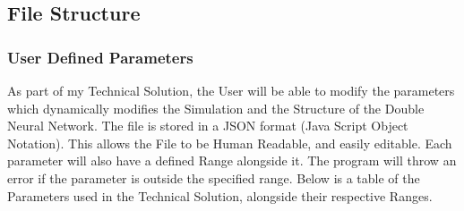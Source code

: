 \begin{flushleft}
\begin{figure}[H]
                    {
                    }
                \end{figure}
        \subsection{File Structure}
            \subsubsection{User Defined Parameters}
                As part of my Technical Solution, the User will be able to modify the parameters which dynamically modifies the Simulation
                and the Structure of the Double Neural Network. The file is stored in a JSON format (Java Script Object Notation).
                This allows the File to be Human Readable, and easily editable. Each parameter will also have a defined Range alongside it.
                The program will throw an error if the parameter is outside the specified range. Below is a table of the Parameters used in
                the Technical Solution, alongside their respective Ranges. \\

                \vspace{0.5cm}


\end{flushleft}
